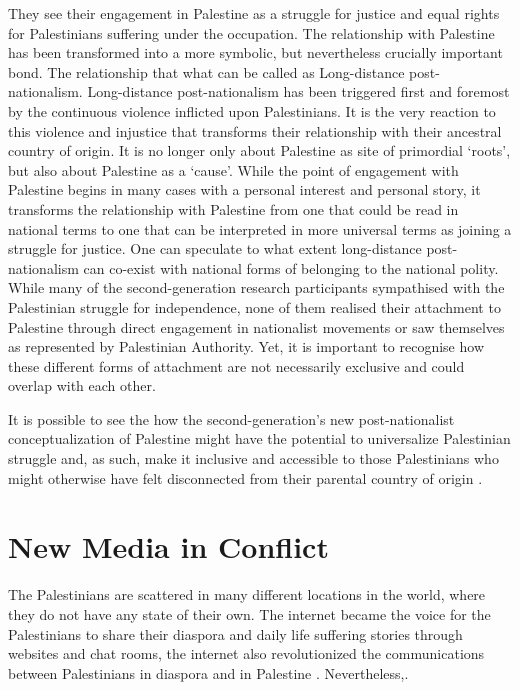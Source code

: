 They see their engagement in Palestine as a struggle for justice and equal 
rights for Palestinians suffering under the occupation. The relationship with Palestine has been transformed into a more 
symbolic, but nevertheless crucially important bond. The relationship that what can be called as Long-distance post-nationalism. Long-distance post-nationalism  has been triggered 
first and foremost by the continuous violence inflicted upon Palestinians. It is the very 
reaction to this violence and injustice that transforms their relationship with their 
ancestral country of origin. It is no longer only about Palestine as site of primordial 
‘roots’, but also about Palestine as a ‘cause’. While the point of engagement with Palestine begins in many cases with a personal interest and personal story,  it transforms 
the relationship with Palestine from one that could be read in national 
terms to one that can be interpreted in more universal terms as joining a struggle 
for justice.
One can speculate to what extent 
long-distance post-nationalism can co-exist with national forms of belonging to the 
national polity. While many of the second-generation research participants sympathised 
with the Palestinian struggle for independence, none of them realised their attachment 
to Palestine through direct engagement in nationalist movements or saw themselves as 
represented by Palestinian Authority. Yet, it is important to recognise how these different forms of attachment are not necessarily exclusive and could overlap with each 
other\citep{Blachnicka-Ciacek2018}.

It is possible to see the how the second-generation’s new post-nationalist conceptualization of Palestine might have the potential to universalize Palestinian struggle and, as such, make it inclusive and accessible to those Palestinians who might otherwise have felt disconnected from their parental country of origin \citep{Blachnicka-Ciacek2018}. 

\section{New Media in Conflict}
The Palestinians are scattered in many different locations in the world, where they do not have any state of their own. The internet became the voice for the Palestinians to share their diaspora and daily life suffering stories through websites and chat rooms, the internet also revolutionized the communications between Palestinians in diaspora and in Palestine \citep{Ogunyemi2015, Aouragh2011}. Nevertheless,\cite [p.1]{Aouragh2011}.

